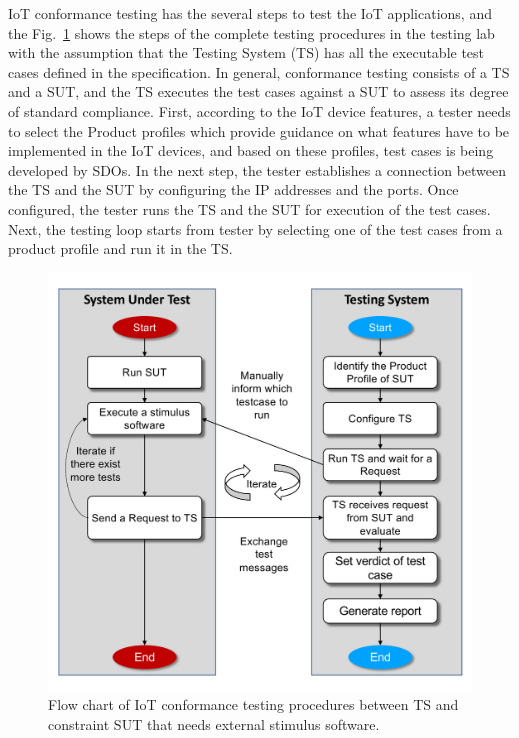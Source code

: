 IoT conformance testing has the several steps to test the IoT applications, and the Fig.~\ref{fig:testing_procedures_in_lab} shows the steps of the complete testing procedures in the testing lab with the assumption that the Testing System (TS) has all the executable test cases defined in the specification. In general, conformance testing consists of a TS and a SUT, and the TS executes the test cases against a SUT to assess its degree of standard compliance. First, according to the IoT device features, a tester needs to select the Product profiles which provide guidance on what features have to be implemented in the IoT devices, and based on these profiles, test cases is being developed by SDOs. In the next step, the tester establishes a connection between the TS and the SUT by configuring the IP addresses and the ports. Once configured, the tester runs the TS and the SUT for execution of the test cases. Next, the testing loop starts from tester by selecting one of the test cases from a product profile and run it in the TS. 
\begin{figure}[H]			%
	\centering
	\includegraphics[width=\textwidth]{figures/fig_testing_procedures_in_the_lab.pdf}
    \caption{Flow chart of IoT conformance testing procedures between TS
and constraint SUT that needs external stimulus software.}
    \label{fig:testing_procedures_in_lab}
\end{figure}
